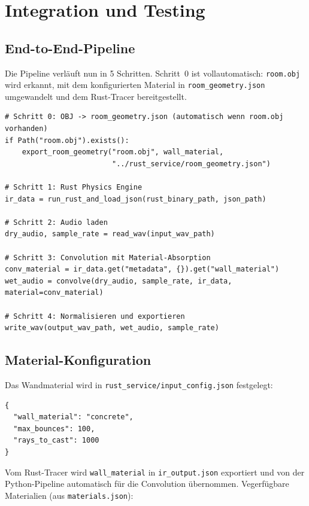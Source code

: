 \documentclass[11pt,a4paper,twoside]{report}
\begin{document}
\chapter{Integration und Testing}

\section{End-to-End-Pipeline}

Die Pipeline verl\"auft nun in 5 Schritten. Schritt~0 ist vollautomatisch:
\texttt{room.obj} wird erkannt, mit dem konfigurierten Material in
\texttt{room\_geometry.json} umgewandelt und dem Rust-Tracer bereitgestellt.

\begin{lstlisting}
# Schritt 0: OBJ -> room_geometry.json (automatisch wenn room.obj vorhanden)
if Path("room.obj").exists():
    export_room_geometry("room.obj", wall_material,
                         "../rust_service/room_geometry.json")

# Schritt 1: Rust Physics Engine
ir_data = run_rust_and_load_json(rust_binary_path, json_path)

# Schritt 2: Audio laden
dry_audio, sample_rate = read_wav(input_wav_path)

# Schritt 3: Convolution mit Material-Absorption
conv_material = ir_data.get("metadata", {}).get("wall_material")
wet_audio = convolve(dry_audio, sample_rate, ir_data, material=conv_material)

# Schritt 4: Normalisieren und exportieren
write_wav(output_wav_path, wet_audio, sample_rate)
\end{lstlisting}

\section{Material-Konfiguration}

Das Wandmaterial wird in \texttt{rust\_service/input\_config.json} festgelegt:

\begin{lstlisting}[language={}]
{
  "wall_material": "concrete",
  "max_bounces": 100,
  "rays_to_cast": 1000
}
\end{lstlisting}

Vom Rust-Tracer wird \texttt{wall\_material} in \texttt{ir\_output.json} exportiert
und von der Python-Pipeline automatisch f\"ur die Convolution \"ubernommen.
Vegerf\"ugbare Materialien (aus \texttt{materials.json}):
\end{document}
